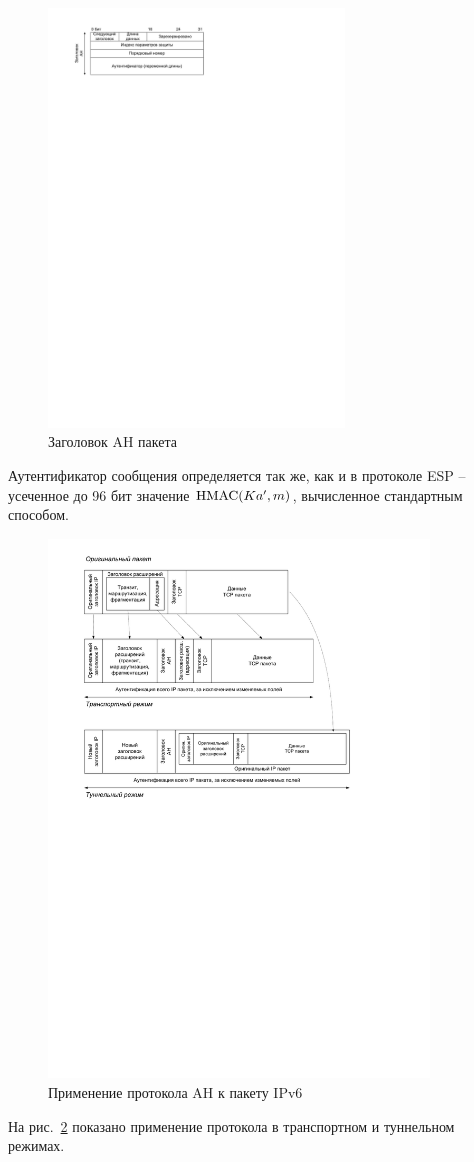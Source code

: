 \begin{figure}[!ht]
	\centering
	\includegraphics[width=0.7\textwidth]{pic/ipsec-ah}
	\caption{Заголовок AH пакета\label{fig:ipsec-ah}}
\end{figure}

Аутентификатор сообщения определяется так же, как и в протоколе ESP --  усеченное до 96 бит значение $\textrm{HMAC}(Ka', m)$, вычисленное стандартным способом.

\begin{figure}[!ht]
	\centering
	\includegraphics[width=0.9\textwidth]{pic/ipsec-ah-modes}
	\caption{Применение протокола AH к пакету IPv6\label{fig:ipsec-ah-modes}}
\end{figure}

На рис.~\ref{fig:ipsec-ah-modes} показано применение протокола в транспортном и туннельном режимах.
